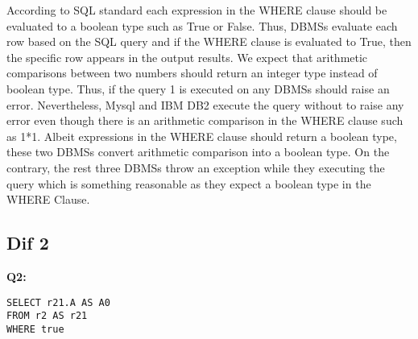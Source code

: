 According to SQL standard each expression in the WHERE clause should be evaluated to a boolean type such as True or False. Thus, DBMSs evaluate each row based on the SQL query and if the WHERE clause is evaluated to True, then the specific row appears in the output results. We expect that arithmetic comparisons between two numbers should return an integer type instead of boolean type. Thus, if the query 1 is executed on any DBMSs should raise an error. Nevertheless, Mysql and IBM DB2 execute the query without to raise any error even though there is an arithmetic comparison  in the WHERE clause such as 1*1. Albeit expressions in the WHERE clause should return a boolean type, these two DBMSs convert arithmetic comparison into a boolean type. On the contrary, the rest three DBMSs throw an exception while they executing the query which is something reasonable as they expect a boolean type in the WHERE Clause. 

\subsection{Dif 2}
  
\begin{mdframed}[backgroundcolor=gray!20] 
\textbf{Q2:}
\begin{lstlisting}
SELECT r21.A AS A0 
FROM r2 AS r21
WHERE true
\end{lstlisting}
\end{mdframed}
 
